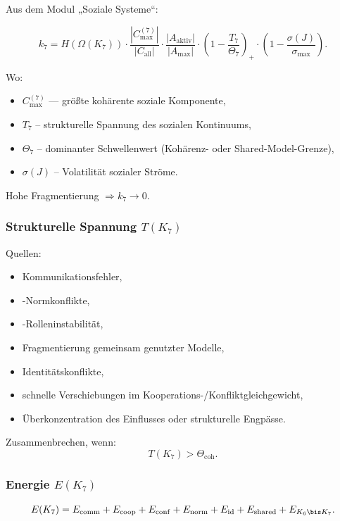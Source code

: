 Aus dem Modul „Soziale Systeme“:

\[
k_7 =
H(\Omega(K_7))
\cdot
\frac{|C_{\max}^{(7)}|}{|C_{\mathrm{all}}|}
\cdot
\frac{|A_{\mathrm{aktiv}}|}{|A_{\max}|}
\cdot
\left(1-\frac{T_7}{\Theta_7}\right)_+
\cdot
\left(1-\frac{\sigma(J)}{\sigma_{\max}}\right).
\]

Wo:
\begin{itemize}
    \item $C_{\max}^{(7)}$ — größte kohärente soziale Komponente,
    \item $T_7$ – strukturelle Spannung des sozialen Kontinuums,
    \item $\Theta_7$ – dominanter Schwellenwert (Kohärenz- oder Shared-Model-Grenze),
    \item $\sigma(J)$ – Volatilität sozialer Ströme.
\end{itemize}

Hohe Fragmentierung $\Rightarrow k_7\to 0$.

\subsubsection{Strukturelle Spannung \texorpdfstring{$T(K_7)$}{T(K_7)}}

Quellen:
\begin{itemize}
    \item Kommunikationsfehler,
    \item-Normkonflikte,
    \item-Rolleninstabilität,
    \item Fragmentierung gemeinsam genutzter Modelle,
    \item Identitätskonflikte,
    \item schnelle Verschiebungen im Kooperations-/Konfliktgleichgewicht,
    \item Überkonzentration des Einflusses oder strukturelle Engpässe.
\end{itemize}

Zusammenbrechen, wenn:
\[
T(K_7) > \Theta_{\mathrm{coh}}.
\]

\subsubsection{Energie \texorpdfstring{$E(K_7)$}{E(K_7)}}

\[
E(K_7)
=
E_{\mathrm{comm}}
+ E_{\mathrm{coop}}
+ E_{\mathrm{conf}}
+ E_{\mathrm{norm}}
+ E_{\mathrm{id}}
+ E_{\mathrm{shared}}
+ E_{K_6\bis K_7}.
\]

